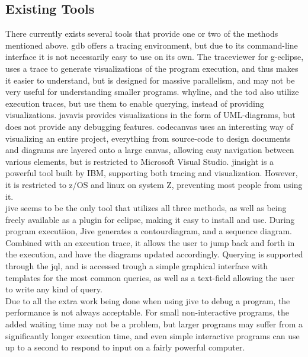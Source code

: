 \subsection{Existing Tools}\label{PreTools}
There currently exists several tools that provide one or two of the methods mentioned above.
\Gls{gdb} offers a tracing environment, but due to its command-line interface %
it is not necessarily easy to use on its own.
The \gls{traceviewer} for g-eclipse, uses a trace to generate visualizations of the program execution, and thus makes it easier to understand, but is  designed for massive parallelism, and may not be very useful for understanding smaller programs.
\Gls{whyline}\cite{ko2009}, and the \gls{tod}\cite{Pothier2007} also utilize execution traces, but use them to enable querying, instead of providing visualizations.
\Gls{javavis} provides visualizations in the form of UML-diagrams, but does not provide any debugging features.
\Gls{codecanvas} uses an interesting way of visualizing an entire project,  everything from source-code to design documents and diagrams  are layered onto a large canvas, allowing easy navigation between various elements, but is restricted to Microsoft Visual Studio.
\Gls{jinsight} is a powerful tool  built by IBM, supporting both tracing and visualization.
However, it is restricted to z/OS and linux on system Z, preventing most people from using it.
~\\%

\Gls{jive} seems to be the only tool that utilizes all three methods, as well as being freely available as a plugin for eclipse, making it easy to install and use.
During program executiion, Jive generates a \gls{contourdiagram}, and a sequence diagram.
Combined with an execution trace, it allows the user to jump back and forth in the  execution, and have the diagrams updated accordingly.
Querying is supported through the \gls{jql}, and is accessed trough a simple graphical interface with templates for the most common queries, as well as a text-field allowing the user to write any kind of query.
~\\
Due to all the extra work being done when using jive to debug a program, the performance is not always acceptable.
For small non-interactive programs, the added waiting time may not be a problem, but larger programs may suffer from a significantly longer execution time, and even simple interactive programs can use up to a second to respond to input on a fairly powerful computer.
~\\

